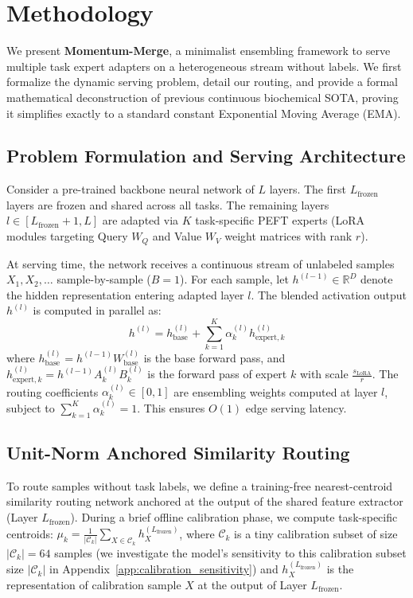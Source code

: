 \section{Methodology}
\label{sec:method}

We present \textbf{Momentum-Merge}, a minimalist ensembling framework to serve multiple task expert adapters on a heterogeneous stream without labels. We first formalize the dynamic serving problem, detail our routing, and provide a formal mathematical deconstruction of previous continuous biochemical SOTA, proving it simplifies exactly to a standard constant Exponential Moving Average (EMA).

\subsection{Problem Formulation and Serving Architecture}
Consider a pre-trained backbone neural network of $L$ layers. The first $L_{\text{frozen}}$ layers are frozen and shared across all tasks. The remaining layers $l \in [L_{\text{frozen}}+1, L]$ are adapted via $K$ task-specific PEFT experts (LoRA \cite{hu2021lora} modules targeting Query $W_Q$ and Value $W_V$ weight matrices with rank $r$).

At serving time, the network receives a continuous stream of unlabeled samples $X_1, X_2, \dots$ sample-by-sample ($B=1$). For each sample, let $h^{(l-1)} \in \mathbb{R}^{D}$ denote the hidden representation entering adapted layer $l$. The blended activation output $h^{(l)}$ is computed in parallel as:
\begin{equation}
    h^{(l)} = h_{\text{base}}^{(l)} + \sum_{k=1}^K \alpha_k^{(l)} h_{\text{expert}, k}^{(l)}
    \label{eq:activation_blending}
\end{equation}
where $h_{\text{base}}^{(l)} = h^{(l-1)} W_{\text{base}}^{(l)}$ is the base forward pass, and $h_{\text{expert}, k}^{(l)} = h^{(l-1)} A_k^{(l)} B_k^{(l)}$ is the forward pass of expert $k$ with scale $\frac{s_{\text{LoRA}}}{r}$. The routing coefficients $\alpha_k^{(l)} \in [0, 1]$ are ensembling weights computed at layer $l$, subject to $\sum_{k=1}^K \alpha_k^{(l)} = 1$. This ensures $O(1)$ edge serving latency.

\subsection{Unit-Norm Anchored Similarity Routing}
To route samples without task labels, we define a training-free nearest-centroid similarity routing network anchored at the output of the shared feature extractor (Layer $L_{\text{frozen}}$).
During a brief offline calibration phase, we compute task-specific centroids: $\mu_k = \frac{1}{|\mathcal{C}_k|} \sum_{X \in \mathcal{C}_k} h_X^{(L_{\text{frozen}})}$, where $\mathcal{C}_k$ is a tiny calibration subset of size $|\mathcal{C}_k| = 64$ samples (we investigate the model's sensitivity to this calibration subset size $|\mathcal{C}_k|$ in Appendix~\ref{app:calibration_sensitivity}) and $h_X^{(L_{\text{frozen}})}$ is the representation of calibration sample $X$ at the output of Layer $L_{\text{frozen}}$.

